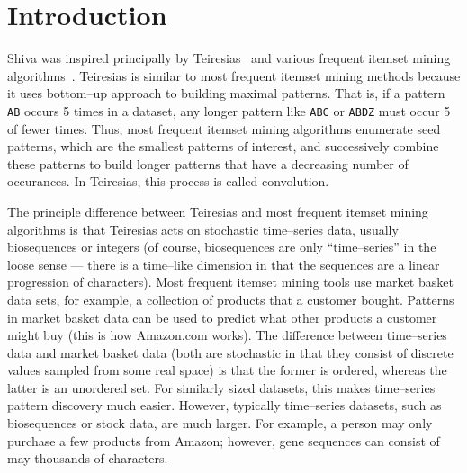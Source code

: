 

\section{Introduction}
Shiva was inspired principally by Teiresias~\cite{rigoutsos1998combinatorial}
and various frequent itemset mining algorithms~\cite{agrawal1995mining,
zaki1997fast}.  Teiresias is similar to most frequent itemset mining
methods because it uses bottom--up approach to building maximal patterns.
That is, if a pattern \texttt{AB} occurs 5 times in a dataset, any longer
pattern like \texttt{ABC} or \texttt{ABDZ} must occur 5 of fewer times.
Thus, most frequent itemset mining algorithms enumerate seed patterns,
which are the smallest patterns of interest, and successively combine
these patterns to build longer patterns that have a decreasing number
of occurances.  In Teiresias, this process is called convolution.

The principle difference between Teiresias and most frequent itemset mining
algorithms is that Teiresias acts on stochastic time--series data, usually
biosequences or integers (of course, biosequences are only ``time--series''
in the loose sense --- there is a time--like dimension in that the sequences
are a linear progression of characters).  Most frequent itemset mining
tools use market basket data sets, for example, a collection of products
that a customer bought.  Patterns in market basket data can be used to
predict what other products a customer might buy (this is how Amazon.com
works).  The difference between time--series data and market basket data
(both are stochastic in that they consist of discrete values sampled from
some real space) is that the former is ordered, whereas the latter is
an unordered set.  For similarly sized datasets, this makes time--series
pattern discovery much easier.  However, typically time--series datasets,
such as biosequences or stock data, are much larger.  For example, a person
may only purchase a few products from Amazon; however, gene sequences can
consist of may thousands of characters.

